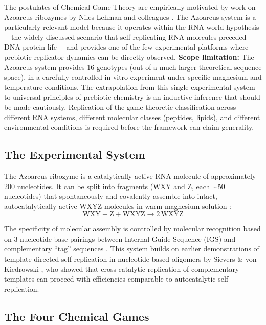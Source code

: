 \documentclass[12pt,a4paper]{article}
\theoremstyle{remark}
\begin{document}
The postulates of Chemical Game Theory are empirically motivated by work on Azoarcus ribozymes by Niles Lehman and colleagues \citep{AzoarcusPNAS,AzoarcusPMC}. The Azoarcus system is a particularly relevant model because it operates within the RNA-world hypothesis---the widely discussed scenario that self-replicating RNA molecules preceded DNA-protein life \citep{Gilbert1986,Eigen1979}---and provides one of the few experimental platforms where prebiotic replicator dynamics can be directly observed. \textbf{Scope limitation:} The Azoarcus system provides 16 genotypes (out of a much larger theoretical sequence space), in a carefully controlled in vitro experiment under specific magnesium and temperature conditions. The extrapolation from this single experimental system to universal principles of prebiotic chemistry is an inductive inference that should be made cautiously. Replication of the game-theoretic classification across different RNA systems, different molecular classes (peptides, lipids), and different environmental conditions is required before the framework can claim generality.

\subsection{The Experimental System}

The Azoarcus ribozyme is a catalytically active RNA molecule of approximately 200 nucleotides. It can be split into fragments (WXY and Z, each $\sim$50 nucleotides) that spontaneously and covalently assemble into intact, autocatalytically active WXYZ molecules in warm magnesium solution \citep{AzoarcusPMC}:
\begin{equation}
\text{WXY} + \text{Z} + \text{WXYZ} \longrightarrow 2\,\text{WXYZ}
\end{equation}

The specificity of molecular assembly is controlled by molecular recognition based on 3-nucleotide base pairings between Internal Guide Sequence (IGS) and complementary ``tag'' sequences \citep{AzoarcusPNAS}. This system builds on earlier demonstrations of template-directed self-replication in nucleotide-based oligomers by Sievers \& von Kiedrowski \citep{SieversKiedrowski1994}, who showed that cross-catalytic replication of complementary templates can proceed with efficiencies comparable to autocatalytic self-replication.

\subsection{The Four Chemical Games}
\end{document}
